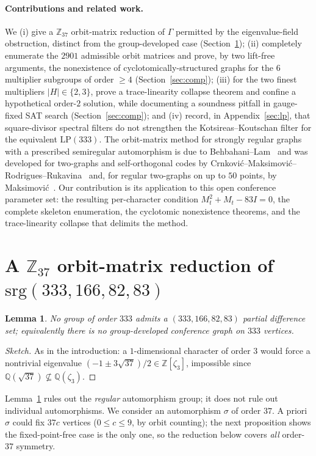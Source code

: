 \documentclass[11pt]{article}
\newtheorem{lemma}{Lemma}
\theoremstyle{definition}
\newcommand{\Z}{\mathbb{Z}}
\newcommand{\Q}{\mathbb{Q}}
\begin{document}
\paragraph{Contributions and related work.} We (i) give a $\Z_{37}$ orbit-matrix reduction of $\Gamma$
permitted by the eigenvalue-field obstruction, distinct from the group-developed case
(Section~\ref{sec:reduction}); (ii) completely enumerate the $2901$ admissible orbit matrices and prove, by
two lift-free arguments, the nonexistence of cyclotomically-structured graphs for the $6$ multiplier
subgroups of order $\ge4$ (Section~\ref{sec:comp}); (iii) for the two finest multipliers $|H|\in\{2,3\}$,
prove a trace-linearity collapse theorem and confine a hypothetical order-$2$ solution, while documenting a
soundness pitfall in gauge-fixed SAT search (Section~\ref{sec:comp}); and (iv) record, in
Appendix~\ref{sec:lp}, that square-divisor spectral filters do not strengthen the Kotsireas--Koutschan
filter for the equivalent $\mathrm{LP}(333)$.
The orbit-matrix method for strongly regular graphs with a prescribed semiregular automorphism is due to
Behbahani--Lam~\cite{behbahani} and was developed for two-graphs and self-orthogonal codes by
Crnkovi\'c--Maksimovi\'c--Rodrigues--Rukavina~\cite{crnkovic} and, for regular two-graphs on up to $50$
points, by Maksimovi\'c~\cite{maksimovic}. Our contribution is its application to this open conference
parameter set: the resulting per-character condition $M_t^2+M_t-83I=0$, the complete skeleton enumeration,
the cyclotomic nonexistence theorems, and the trace-linearity collapse that delimits the method.

\section{A $\Z_{37}$ orbit-matrix reduction of $\mathrm{srg}(333,166,82,83)$}\label{sec:reduction}

\begin{lemma}\label{lem:cayley}
No group of order $333$ admits a $(333,166,82,83)$ partial difference set; equivalently there is no
group-developed conference graph on $333$ vertices.
\end{lemma}
\begin{proof}[Sketch] As in the introduction: a $1$-dimensional character of order $3$ would force a
nontrivial eigenvalue $(-1\pm3\sqrt{37})/2\in\Z[\zeta_3]$, impossible since $\Q(\sqrt{37})\not\subseteq
\Q(\zeta_3)$. \end{proof}

Lemma~\ref{lem:cayley} rules out the \emph{regular} automorphism group; it does not rule out individual
automorphisms. We consider an automorphism $\sigma$ of order $37$. A priori $\sigma$ could fix
$37c$ vertices ($0\le c\le 9$, by orbit counting); the next proposition shows the fixed-point-free
case is the only one, so the reduction below covers \emph{all} order-$37$ symmetry.
\end{document}
